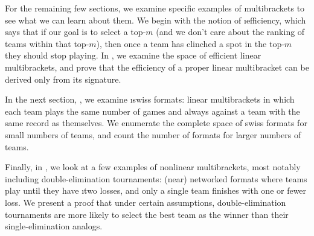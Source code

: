 {    For the remaining few sections, we examine specific examples of multibrackets to see what we can learn about them. We begin with the notion of \i{efficiency}, which says that if our goal is to select a top-$m$ (and we don't care about the ranking of teams within that top-$m$), then once a team has clinched a spot in the top-$m$ they should stop playing. In , we examine the space of efficient linear multibrackets, and prove that the efficiency of a proper linear multibracket can be derived only from its signature.

    In the next section, , we examine \i{swiss formats}: linear multibrackets in which each team plays the same number of games and always against a team with the same record as themselves. We enumerate the complete space of swiss formats for small numbers of teams, and count the number of formats for larger numbers of teams.

    Finally, in , we look at a few examples of nonlinear multibrackets, most notably including double-elimination tournaments: (near) networked formats where teams play until they have \i{two} losses, and only a single team finishes with one or fewer loss. We present a proof that under certain assumptions, double-elimination tournaments are more likely to select the best team as the winner than their single-elimination analogs.
}










